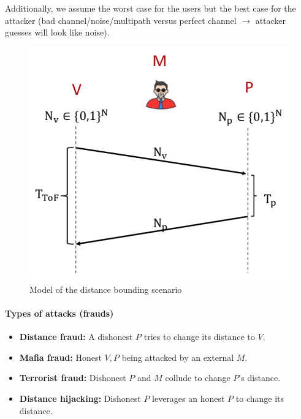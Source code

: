 
Additionally, we assume the worst case for the users but the best case for the attacker (bad channel/noise/multipath versus perfect channel $\rightarrow$ attacker guesses will look like noise).

\begin{figure}[h]
	\centering
	\includegraphics[scale=0.4]{images/5-model.png}
	\caption{Model of the distance bounding scenario}%
	\label{fig:ranging-model}
\end{figure}

\paragraph{Types of attacks (frauds)}
\begin{itemize}
	\item \textbf{Distance fraud:} A dishonest $P$ tries to change its distance to $V$.
	\item \textbf{Mafia fraud:} Honest $V, P$ being attacked by an external $M$.
	\item \textbf{Terrorist fraud:} Dishonest $P$ and $M$ collude to change $P$'s distance.
	\item \textbf{Distance hijacking:} Dishonest $P$ leverages an honest $P$ to change its distance.
\end{itemize}


